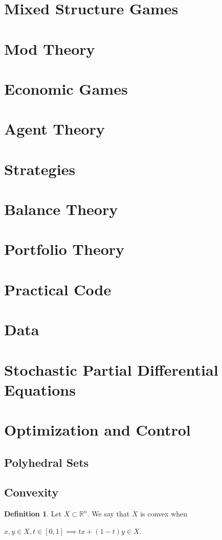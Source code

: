 \documentclass[]{article}
\theoremstyle{definition}
\newtheorem{definition}{Definition}[section]
\theoremstyle{definition}
\newcommand{\bb}{\mathbb}
\begin{document}
	\section{Mixed Structure Games}
	\section{Mod Theory}
	
	\section{Economic Games}
	\section{Agent Theory}
	\section{Strategies}
	\section{Balance Theory}
	\section{Portfolio Theory}
	\section{Practical Code}
	\section{Data}
	\section{Stochastic Partial Differential Equations}
	\section{Optimization and Control}
		\subsection{Polyhedral Sets}
		\subsection{Convexity}
		
		\begin{definition}
			Let $X \subset \bb{R}^n$. We say that $X$ is convex when
			
			\begin{center}
				$x, y \in X, t \in [0, 1] \implies tx + (1-t)y \in X$.
			\end{center}
			
		\end{definition}
		
\end{document}
